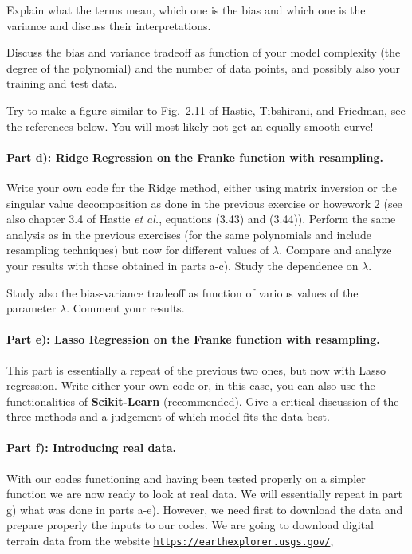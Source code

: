 \documentclass[%
oneside,                 %
final,                   %
10pt]{article}
\begin{document}
Explain what the terms mean, which one is the bias and which one is
the variance and discuss their interpretations.


Discuss the bias and variance tradeoff as function
of your model complexity (the degree of the polynomial) and the number
of data points, and possibly also your training and test data.

Try to make a figure similar to Fig.~2.11 of Hastie, Tibshirani, and
Friedman, see the references below. You will most likely not get an
equally smooth curve!

\paragraph{Part d): Ridge Regression on the Franke function  with resampling.}
Write your own code for the Ridge method, either using matrix
inversion or the singular value decomposition as done in the previous
exercise or howework 2 (see also chapter 3.4 of Hastie \emph{et al.},
equations (3.43) and (3.44)). Perform the same analysis as in the
previous exercises (for the same polynomials and include resampling
techniques) but now for different values of $\lambda$. Compare and
analyze your results with those obtained in parts a-c). Study the
dependence on $\lambda$.

Study also the bias-variance tradeoff as function of various values of
the parameter $\lambda$. Comment your results. 

\paragraph{Part e): Lasso Regression on the Franke function  with resampling.}
This part is essentially a repeat of the previous two ones, but now
with Lasso regression. Write either your own code or, in this case,
you can also use the functionalities of \textbf{Scikit-Learn} (recommended). 
Give a
critical discussion of the three methods and a judgement of which
model fits the data best.

\paragraph{Part f): Introducing real data.}
With our codes functioning and having been tested properly on a
simpler function we are now ready to look at real data. We will
essentially repeat in part g) what was done in parts a-e). However, we
need first to download the data and prepare properly the inputs to our
codes.  We are going to download digital terrain data from the website
\href{{https://earthexplorer.usgs.gov/}}{\nolinkurl{https://earthexplorer.usgs.gov/}},
\end{document}
